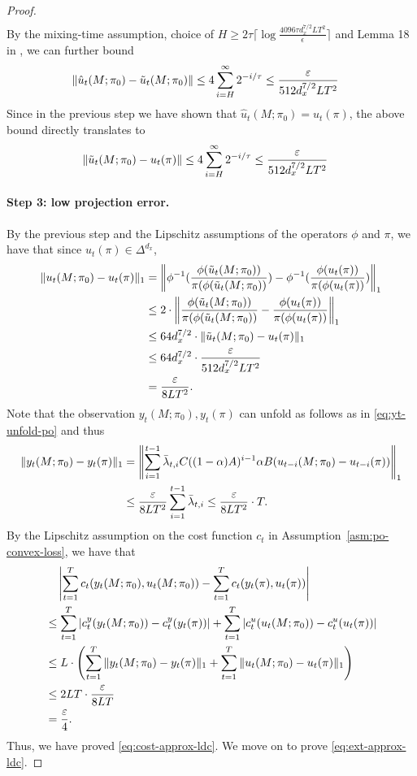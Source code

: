 \begin{proof}
\begin{align*}
\end{align*}
By the mixing-time assumption, choice of $H\ge 2\tau\lceil \log\frac{4096\tau d_x^{7/2} L T^2}{\epsilon}\rceil$ and Lemma 18 in \citep{golowich2024online}, we can further bound 
\begin{align*}
\|\hat{u}_t(M;\pi_0)-\tilde{u}_t(M;\pi_0)\|&\le 4 \sum_{i=H}^{\infty}2^{-i/\tau}\le \frac{\varepsilon}{512d_x^{7/2}LT^2}
\end{align*}
Since in the previous step we have shown that $\hat{u}_t(M;\pi_0)=u_t(\pi)$, the above bound directly translates to
\begin{align*}
\|\tilde{u}_t(M;\pi_0)-u_t(\pi)\|&\le 4 \sum_{i=H}^{\infty}2^{-i/\tau}\le \frac{\varepsilon}{512d_x^{7/2}LT^2}
\end{align*}

\paragraph{Step 3: low projection error.} By the previous step and the Lipschitz assumptions of the operators $\phi$ and $\pi$, we have that since $u_t(\pi)\in\Delta^{d_x}$,
\begin{align*}
\|u_t(M;\pi_0)-u_t(\pi)\|_1&=\left\|\phi^{-1}(\frac{\phi( \tilde{u}_t(M;\pi_0))}{\pi(\phi( \tilde{u}_t(M;\pi_0))})-\phi^{-1}(\frac{\phi( u_t(\pi))}{\pi(\phi( u_t(\pi))})\right\|_1\\
&\le 2\cdot \left\|\frac{\phi( \tilde{u}_t(M;\pi_0))}{\pi(\phi( \tilde{u}_t(M;\pi_0))}-\frac{\phi( u_t(\pi))}{\pi(\phi( u_t(\pi))}\right\|_1\\
&\le 64 d_x^{7/2}\cdot \|\tilde{u}_t(M;\pi_0)-u_t(\pi)\|_1\\
&\le 64 d_x^{7/2}\cdot \frac{\varepsilon}{512d_x^{7/2}LT^2}\\
&= \frac{\varepsilon}{8LT^2}.
\end{align*}
Note that the observation $y_t(M;\pi_0), y_t(\pi)$ can unfold as follows as in \cref{eq:yt-unfold-po} and thus
\begin{align*}
\|y_t(M;\pi_0)-y_t(\pi)\|_1&=\left\|\sum_{i=1}^{t-1}\bar{\lambda}_{t,i}C((1-\alpha)A)^{i-1}\alpha B(u_{t-i}(M;\pi_0)-u_{t-i}(\pi))\right\|_1\\
&\le \frac{\varepsilon}{8LT^2} \sum_{i=1}^{t-1}\bar{\lambda}_{t,i} \le  \frac{\varepsilon}{8LT^2} \cdot T. 
\end{align*}
By the Lipschitz assumption on the cost function $c_t$ in Assumption~\ref{asm:po-convex-loss}, we have that
\begin{align*}
&\quad \left|\sum_{t=1}^T c_t(y_t(M;\pi_0),u_t(M;\pi_0))-\sum_{t=1}^T c_t(y_t(\pi), u_t(\pi))\right|\\
&\le \sum_{t=1}^T |c_t^y(y_t(M;\pi_0))-c_t^y(y_t(\pi))|+\sum_{t=1}^T |c_t^u(u_t(M;\pi_0))-c_t^u(u_t(\pi))|\\
&\le L\cdot \left(\sum_{t=1}^T \|y_t(M;\pi_0)-y_t(\pi)\|_1+\sum_{t=1}^T \|u_t(M;\pi_0)-u_t(\pi)\|_1\right)\\
&\le 2LT \cdot \frac{\varepsilon}{8LT}\\
&= \frac{\varepsilon}{4}.
\end{align*}
Thus, we have proved \cref{eq:cost-approx-ldc}. We move on to prove \cref{eq:ext-approx-ldc}. 


\end{proof}
